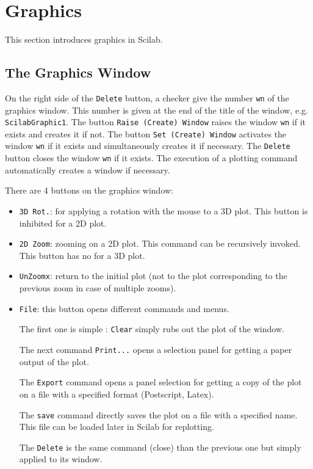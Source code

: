 \chapter{Graphics}
This section introduces graphics in Scilab. 

\section{The Graphics Window}
On the right side of the {\tt Delete} button, a checker give the number 
{\tt wn} of the graphics window. This number is given at the end of the
title of the window, e.g. {\tt ScilabGraphic1}. The button 
{\tt Raise (Create) Window}
raises the window {\tt wn} if it exists and creates it if not. The 
button {\tt Set (Create) Window} activates the window {\tt wn} if it exists 
and simultaneously creates it if necessary.
The {\tt Delete} button closes the window {\tt wn} if it exists.
The execution of a plotting command automatically creates a window if 
necessary.

There are 4 buttons on the graphics window:
\begin{itemize}
	\item \verb+3D Rot.+: for applying a rotation with the mouse to a
3D plot. This button is inhibited for a 2D plot.
	\item \verb+2D Zoom+: zooming on a 2D plot. This command can be
recursively invoked. This button  has no for a 3D plot.
	\item \verb+UnZoomx+: return to the initial plot (not to the plot
corresponding to the previous zoom in case of multiple zooms).
	\item \verb+File+: this button opens different commands and menus.

The first one is simple : {\tt Clear} simply rubs out the plot of the window.

The next command {\tt Print...} opens a selection panel for getting a
paper output of the plot.

The {\tt Export} command opens a panel selection for getting a copy of the 
plot on a file with a specified format (Postscript, Latex).

The {\tt save} command directly saves the plot on a file with a specified name.
This file can be loaded later in Scilab for replotting.

The {\tt Delete} is the same command (close) than the previous one but simply 
applied to its window. 

\end{itemize}

